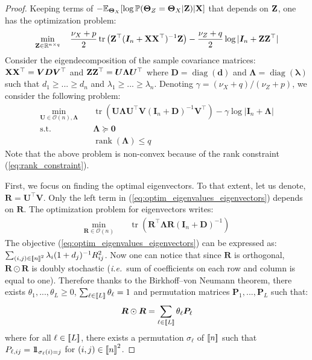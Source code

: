 \begin{proof}
Keeping terms of $-\mathbb{E}_{\bm{\Theta}_{X}}[\log \mathbb{P}(\bm{\Theta}_{Z} = \bm{\Theta}_{X}| \mathbf{Z} )| \mathbf{X}]$ that depends on $\mathbf{Z}$, one has the optimization problem:
\begin{align*}
    \min_{\mathbf{Z} \in \mathbb{R}^{n \times q}} \quad \frac{\nu_{X}+p}{2}\operatorname{tr}\left(\mathbf{Z}^\top(\bm{I}_n +  \mathbf{X}\mathbf{X}^\top)^{-1}\mathbf{Z}\right) - \frac{\nu_{Z}+q}{2}\log |\bm{I}_n +  \mathbf{Z}\mathbf{Z}^\top|
\end{align*}
Consider the eigendecomposition of the sample covariance matrices: $\mathbf{X}\mathbf{X}^\top = \bm{V D} \bm{V}^\top$ and $\mathbf{Z}\mathbf{Z}^\top = \bm{U \Lambda} \bm{U}^\top$ where $\bm{D}=\operatorname{diag}(\bm{d})$ and $\bm{\Lambda}=\operatorname{diag}(\bm{\lambda})$ such that $d_1 \geq ... \geq d_n$ and $\lambda_1 \geq ... \geq \lambda_n$. Denoting $\gamma = (\nu_{X}+q)/(\nu_{Z}+p)$, we consider the following problem:
\begin{align}
   \min_{\bm{U} \in \mathcal{O}(n), \bm{\Lambda}} \quad & \operatorname{tr}\left(\bm{U} \bm{\Lambda} \bm{U}^\top \bm{V} (\bm{I}_n + \bm{D})^{-1} \bm{V}^\top\right) - \gamma \log |\bm{I}_n + \bm{\Lambda}| \label{eq:optim_eigenvalues_eigenvectors} \\
    \textrm{s.t.} \quad & \bm{\Lambda} \succcurlyeq \bm{0} \label{eq:positive_definite_constraint}\\
    & \operatorname{rank}(\bm{\Lambda}) \leq q \label{eq:rank_constraint}
\end{align}
Note that the above problem is non-convex because of the rank constraint (\ref{eq:rank_constraint}). 

First, we focus on finding the optimal eigenvectors. To that extent, let us denote, $\bm{R} = \bm{U}^\top\bm{V}$. Only the left term in (\ref{eq:optim_eigenvalues_eigenvectors}) depends on $\bm{R}$. The optimization problem for eigenvectors writes:
\begin{align}
   \min_{\bm{R} \in \mathcal{O}(n)} \quad & \operatorname{tr}\left(\bm{R}^\top \bm{\Lambda} \bm{R} (\bm{I}_n + \bm{D})^{-1} \right) \label{eq:optim_eigenvalues_eigenvectors}
\end{align}
The objective (\ref{eq:optim_eigenvalues_eigenvectors}) can be expressed as: $\sum_{(i,j) \in {[\![n]\!]}^2} \lambda_i (1 + d_j)^{-1} R_{ij}^2$. Now one can notice that since $\bm{R}$ is orthogonal, $\bm{R} \odot \bm{R}$ is doubly stochastic (\textit{i.e.}\ sum of coefficients on each row and column is equal to one). Therefore thanks to the Birkhoff–von Neumann theorem, there exists $\theta_1, ..., \theta_L \geq 0$, $\sum_{\ell \in {[\![L]\!]}} \theta_\ell = 1$ and permutation matrices $\bm{P}_1, ..., \bm{P}_L$ such that:
$$\bm{R} \odot \bm{R} = \sum_{\ell \in {[\![L]\!]}} \theta_\ell \bm{P}_\ell$$
where for all $\ell \in {[\![L]\!]}$, there exists a permutation $\sigma_\ell$ of ${[\![n]\!]}$ such that $P_{\ell,ij} = 1\!\!1_{\sigma_{\ell}(i) = j}$ for $(i,j) \in {[\![n]\!]}^2$. 


\end{proof}
